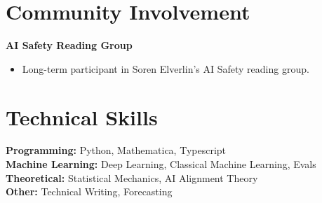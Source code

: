 \documentclass{article}
\begin{document}
\section*{Community Involvement}
\textbf{AI Safety Reading Group}
\begin{itemize}[leftmargin=*]
\item Long-term participant in Soren Elverlin's AI Safety reading group.
\end{itemize}

\section*{Technical Skills}
\textbf{Programming:} Python, Mathematica, Typescript\\
\textbf{Machine Learning:} Deep Learning, Classical Machine Learning, Evals\\
\textbf{Theoretical:} Statistical Mechanics, AI Alignment Theory\\
\textbf{Other:} Technical Writing, Forecasting
\end{document}
